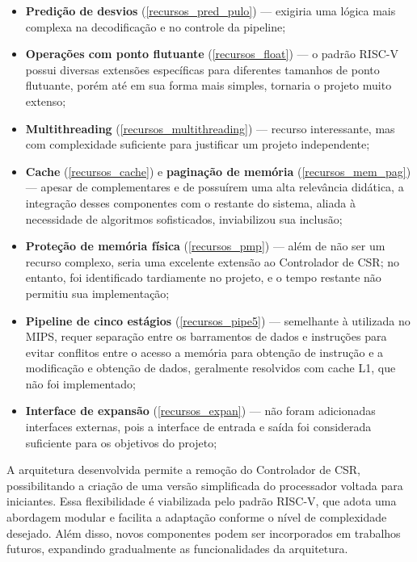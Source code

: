 \documentclass[
	12pt,				%
	openright,			%
	oneside,			%
	a4paper,			%
	english,			%
	french,				%
	spanish,			%
	brazil,				%
	]{abntex2}
\begin{document}
\begin{itemize}\label{recursos_nao_implementados}
    \item \textbf{Predição de desvios} (\ref{recursos_pred_pulo}) — exigiria uma lógica mais complexa na decodificação e no controle da pipeline;

    \item \textbf{Operações com ponto flutuante} (\ref{recursos_float}) — o padrão RISC-V possui diversas extensões específicas para diferentes tamanhos de ponto flutuante, porém até em sua forma mais simples, tornaria o projeto muito extenso;

    \item \textbf{Multithreading} (\ref{recursos_multithreading}) — recurso interessante, mas com complexidade suficiente para justificar um projeto independente;

    \item \textbf{Cache} (\ref{recursos_cache}) e \textbf{paginação de memória} (\ref{recursos_mem_pag}) — apesar de complementares e de possuírem uma alta relevância didática, a integração desses componentes com o restante do sistema, aliada à necessidade de algoritmos sofisticados, inviabilizou sua inclusão;

    \item \textbf{Proteção de memória física} (\ref{recursos_pmp}) — além de não ser um recurso complexo, seria uma excelente extensão ao Controlador de CSR; no entanto, foi identificado tardiamente no projeto, e o tempo restante não permitiu sua implementação;

    \item \textbf{Pipeline de cinco estágios} (\ref{recursos_pipe5}) — semelhante à utilizada no MIPS, requer separação entre os barramentos de dados e instruções para evitar conflitos entre o acesso a memória para obtenção de instrução e a modificação e obtenção de dados, geralmente resolvidos com cache L1, que não foi implementado;

    \item \textbf{Interface de expansão} (\ref{recursos_expan}) — não foram adicionadas interfaces externas, pois a interface de entrada e saída foi considerada suficiente para os objetivos do projeto;
\end{itemize}

A arquitetura desenvolvida permite a remoção do Controlador de CSR, possibilitando a criação de uma versão simplificada do processador voltada para iniciantes. Essa flexibilidade é viabilizada pelo padrão RISC-V, que adota uma abordagem modular e facilita a adaptação conforme o nível de complexidade desejado. Além disso, novos componentes podem ser incorporados em trabalhos futuros, expandindo gradualmente as funcionalidades da arquitetura.
\end{document}
